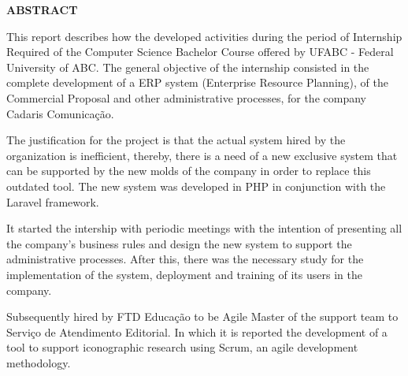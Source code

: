 \documentclass[
  12pt,            %
  openany,
  oneside,
  a4paper,         %
  english,      %
  brazil
]{article}
\numberwithin{figure}{section}
\numberwithin{table}{section}
\begin{document}
\begin{titlepage}

\begin{center}
  \textbf{ABSTRACT}
\end{center}

This report describes how the developed activities during the period of Internship Required of the Computer Science Bachelor Course offered by UFABC - Federal University of ABC. The general objective of the internship consisted in the complete development of a ERP system (Enterprise Resource Planning), of the Commercial Proposal and other administrative processes, for the company Cadaris Comunicação.

The justification for the project is that the actual system hired by the organization is inefficient, thereby, there is a need of a new exclusive system that can be supported by the new molds of the company in order to replace this outdated tool. The new system was developed in PHP in conjunction with the Laravel framework.

It started the intership with periodic meetings with the intention of presenting all the company's business rules and design the new system to support the administrative processes. After this, there was the necessary study for the implementation of the system, deployment and training of its users in the company.

Subsequently hired by FTD Educação to be Agile Master of the support team to Serviço de Atendimento Editorial. In which it is reported the development of a tool to support iconographic research using Scrum, an agile development methodology.

\end{titlepage}



\begin{titlepage}

\begin{singlespace}
  \listoffigures
\end{singlespace}

\end{titlepage}






\begin{titlepage}

\begin{singlespace}
{\small
  \tableofcontents
}
\end{singlespace}

\end{titlepage}
\end{document}
